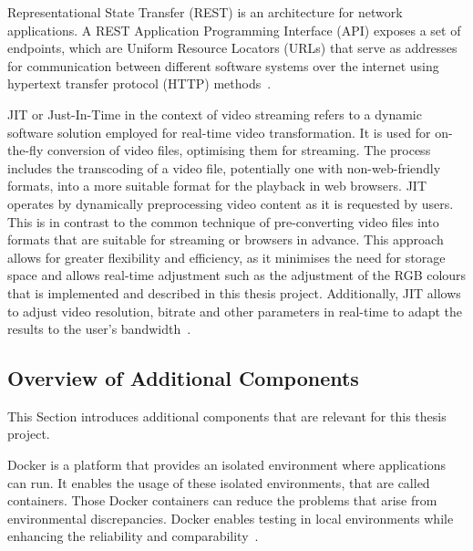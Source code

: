 \documentclass[../MasterThesis.tex]{subfiles}
\begin{document}


Representational State Transfer (REST) is an architecture for network applications. A REST Application Programming Interface (API) exposes a set of endpoints, which are Uniform Resource Locators (URLs) that serve as addresses for communication between different software systems over the internet using hypertext transfer protocol (HTTP) methods~\cite{IEEE_Rest, webservice, Nodejs_Rest}.



	
JIT or Just-In-Time in the context of video streaming refers to a dynamic software solution employed for real-time video transformation. 
It is used for on-the-fly conversion of video files, optimising them for streaming. The process includes the transcoding of a video file, potentially one with non-web-friendly formats, into a more suitable format for the playback in web browsers.
JIT operates by dynamically preprocessing video content as it is requested by users. This is in contrast to the common technique of pre-converting video files into formats that are suitable for streaming or browsers in advance. 
This approach allows for greater flexibility and efficiency, as it minimises the need for storage space and allows real-time adjustment such as the adjustment of the RGB colours that is implemented and described in this thesis project.
Additionally, JIT allows to adjust video resolution, bitrate and other parameters in real-time to adapt the results to the user's bandwidth~\cite{JIT_IEEE}.







\subsection{Overview of Additional Components}
\label{subsection:overview_additional_components}


This Section introduces additional components that are relevant for this thesis project.


Docker is a platform that provides an isolated environment where applications can run. It enables the usage of these isolated environments, that are called containers.
Those Docker containers can reduce the problems that arise from environmental discrepancies. Docker enables testing in local environments while enhancing the reliability and comparability~\cite{docker}.
\end{document}
